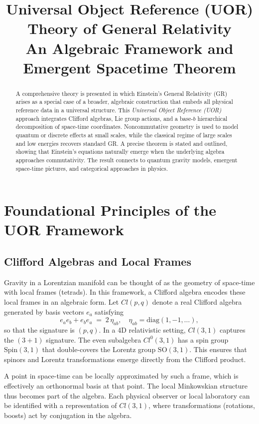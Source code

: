 \documentclass[11pt]{article}
\title{\textbf{Universal Object Reference (UOR) Theory of General Relativity}\\
\large An Algebraic Framework and Emergent Spacetime Theorem}
\author{}
\date{}
\begin{document}
\maketitle

\begin{abstract}
A comprehensive theory is presented in which Einstein's General Relativity (GR) arises as a special case of a broader, algebraic construction that embeds all physical reference data in a universal structure. This \emph{Universal Object Reference (UOR)} approach integrates Clifford algebras, Lie group actions, and a base-$b$ hierarchical decomposition of space-time coordinates. Noncommutative geometry is used to model quantum or discrete effects at small scales, while the classical regime of large scales and low energies recovers standard GR. A precise theorem is stated and outlined, showing that Einstein’s equations naturally emerge when the underlying algebra approaches commutativity. The result connects to quantum gravity models, emergent space-time pictures, and categorical approaches in physics.
\end{abstract}

\tableofcontents

\section{Foundational Principles of the UOR Framework}
\label{sec:foundation}

\subsection{Clifford Algebras and Local Frames}
Gravity in a Lorentzian manifold can be thought of as the geometry of space-time with local frames (tetrads). In this framework, a Clifford algebra encodes these local frames in an algebraic form. Let $Cl(p,q)$ denote a real Clifford algebra generated by basis vectors $e_a$ satisfying
\[
e_a e_b + e_b e_a \;=\; 2\,\eta_{ab}, \quad \eta_{ab} = \mathrm{diag}(1, -1, \dots),
\]
so that the signature is $(p,q)$. In a 4D relativistic setting, $Cl(3,1)$ captures the $(3+1)$ signature. The even subalgebra $Cl^0(3,1)$ has a spin group $\mathrm{Spin}(3,1)$ that double-covers the Lorentz group $\mathrm{SO}(3,1)$. This ensures that spinors and Lorentz transformations emerge directly from the Clifford product. 

A point in space-time can be locally approximated by such a frame, which is effectively an orthonormal basis at that point. The local Minkowskian structure thus becomes part of the algebra. Each physical observer or local laboratory can be identified with a representation of $Cl(3,1)$, where transformations (rotations, boosts) act by conjugation in the algebra.
\end{document}
